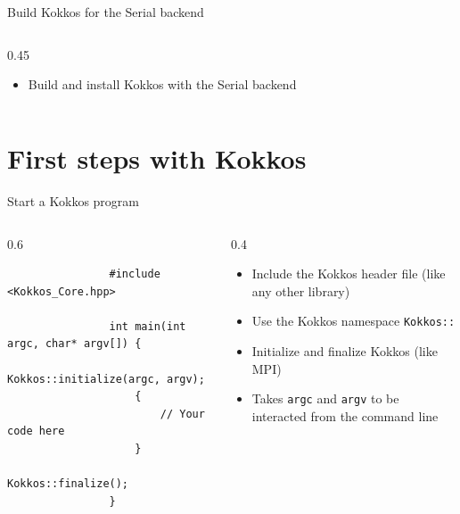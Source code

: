 \documentclass[
    aspectratio=169,
]{beamer}
\begin{document}
\begin{exerciseframe}{Build Kokkos for the Serial backend}
    \begin{columns}
        \begin{column}{0.45\linewidth}
            \begin{itemize}
                \item Build and install Kokkos with the Serial backend
            \end{itemize}
        \end{column}
    \end{columns}
\end{exerciseframe}

\section{First steps with Kokkos}

\begin{frame}[fragile]{Start a Kokkos program}
    \begin{columns}
        \begin{column}{0.6\linewidth}
            \begin{verbatim}
                #include <Kokkos_Core.hpp>

                int main(int argc, char* argv[]) {
                    Kokkos::initialize(argc, argv);
                    {
                        // Your code here
                    }
                    Kokkos::finalize();
                }
            \end{verbatim}
        \end{column}
        \begin{column}{0.4\linewidth}
            \begin{itemize}
                \item Include the Kokkos header file (like any other library)
                \item Use the Kokkos namespace \texttt{Kokkos::}
                \item Initialize and finalize Kokkos (like MPI)
                \item Takes \texttt{argc} and \texttt{argv} to be interacted from the command line
            \end{itemize}
        \end{column}
    \end{columns}
\end{frame}
\end{document}
